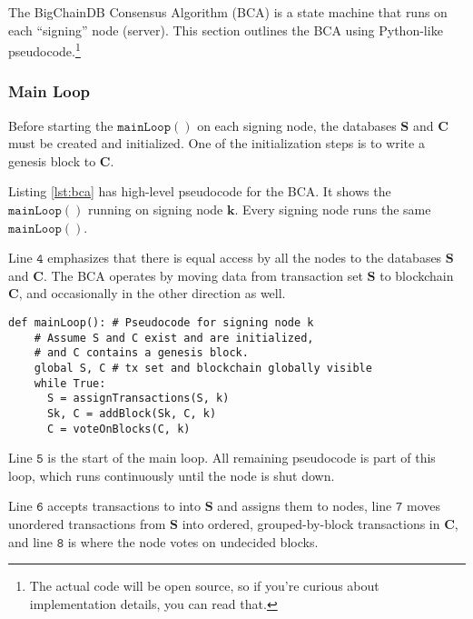 The BigChainDB Consensus Algorithm (BCA) is a state machine that runs on each “signing” node (server).
This section outlines the BCA using Python-like pseudocode.\footnote{The actual code will be open source, so if you’re curious about implementation details, you can read that.}

\subsubsection{Main Loop}

Before starting the $\mathtt{mainLoop()}$ on each signing node, the databases $\mathbf{S}$ and $\mathbf{C}$ must be created and initialized.
One of the initialization steps is to write a genesis block to $\mathbf{C}$.

Listing \ref{lst:bca} has high-level pseudocode for the BCA.
It shows the $\mathtt{mainLoop()}$ running on signing node $\mathbf{k}$.
Every signing node runs the same $\mathtt{mainLoop()}$.

Line $\mathtt{4}$ emphasizes that there is equal access by all the nodes to the databases $\mathbf{S}$ and $\mathbf{C}$. 
The BCA operates by moving data from transaction set $\mathbf{S}$ to blockchain $\mathbf{C}$, and occasionally in the other direction as well.

\begin{minipage}{\linewidth}
  \begin{lstlisting}[caption={BigchainDB Consensus Algorithm. This algorithm runs on every signing node.}, label={lst:bca}, style=python]
  def mainLoop(): # Pseudocode for signing node k 
    # Assume S and C exist and are initialized,
    # and C contains a genesis block. 
    global S, C # tx set and blockchain globally visible
    while True: 
      S = assignTransactions(S, k) 
      Sk, C = addBlock(Sk, C, k) 
      C = voteOnBlocks(C, k)
  \end{lstlisting}
\end{minipage}

Line $\mathtt{5}$ is the start of the main loop. All remaining pseudocode is part of this loop, which runs continuously until the node is shut down.

Line $\mathtt{6}$ accepts transactions to into $\mathbf{S}$ and assigns them to nodes, line $\mathtt{7}$ moves unordered transactions from $\mathbf{S}$ into ordered, grouped-by-block transactions in $\mathbf{C}$, and line $\mathtt{8}$ is where the node votes on undecided blocks.

